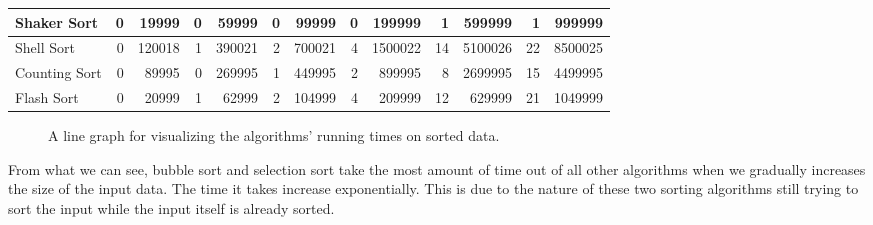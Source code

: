 \documentclass{article}
\newcommand\tab[1][0.5cm]{\hspace*{#1}}
\begin{document}
\begin{table}[H]
\begin{adjustbox}{width=\columnwidth,center}
\begin{tabular}{|l|rrrrrrrrrrrr|}
Shaker Sort                        & \multicolumn{1}{r|}{0}            & \multicolumn{1}{r|}{19999}      & \multicolumn{1}{r|}{0}            & \multicolumn{1}{r|}{59999}      & \multicolumn{1}{r|}{0}            & \multicolumn{1}{r|}{99999}      & \multicolumn{1}{r|}{0}            & \multicolumn{1}{r|}{199999}     & \multicolumn{1}{r|}{1}            & \multicolumn{1}{r|}{599999}      & \multicolumn{1}{r|}{1}            & 999999                          \\ \hline
Shell Sort                         & \multicolumn{1}{r|}{0}            & \multicolumn{1}{r|}{120018}     & \multicolumn{1}{r|}{1}            & \multicolumn{1}{r|}{390021}     & \multicolumn{1}{r|}{2}            & \multicolumn{1}{r|}{700021}     & \multicolumn{1}{r|}{4}            & \multicolumn{1}{r|}{1500022}    & \multicolumn{1}{r|}{14}           & \multicolumn{1}{r|}{5100026}     & \multicolumn{1}{r|}{22}           & 8500025                         \\ \hline
Counting Sort                      & \multicolumn{1}{r|}{0}            & \multicolumn{1}{r|}{89995}      & \multicolumn{1}{r|}{0}            & \multicolumn{1}{r|}{269995}     & \multicolumn{1}{r|}{1}            & \multicolumn{1}{r|}{449995}     & \multicolumn{1}{r|}{2}            & \multicolumn{1}{r|}{899995}     & \multicolumn{1}{r|}{8}            & \multicolumn{1}{r|}{2699995}     & \multicolumn{1}{r|}{15}           & 4499995                         \\ \hline
Flash Sort                         & \multicolumn{1}{r|}{0}            & \multicolumn{1}{r|}{20999}      & \multicolumn{1}{r|}{1}            & \multicolumn{1}{r|}{62999}      & \multicolumn{1}{r|}{2}            & \multicolumn{1}{r|}{104999}     & \multicolumn{1}{r|}{4}            & \multicolumn{1}{r|}{209999}     & \multicolumn{1}{r|}{12}           & \multicolumn{1}{r|}{629999}      & \multicolumn{1}{r|}{21}           & 1049999                         \\ \hline
\end{tabular}
\end{adjustbox}
\end{table}

\begin{figure}[H]
\caption{ A line graph for visualizing the algorithms’ running times on sorted data.}
\centering
\end{figure}

\tab From what we can see, bubble sort and selection sort take the most amount of time out of all other algorithms when we gradually increases the size of the input data. The time it takes increase exponentially. This is due to the nature of these two sorting algorithms still trying to sort the input while the input itself is already sorted.
\end{document}
